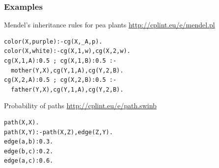 \documentclass[trans]{beamer}
\begin{document}
\begin{frame}[fragile]
  \frametitle{Examples}
Mendel's inheritance rules for pea plants \url{http://cplint.eu/e/mendel.pl}
\begin{verbatim}
color(X,purple):-cg(X,_A,p).
color(X,white):-cg(X,1,w),cg(X,2,w).
cg(X,1,A):0.5 ; cg(X,1,B):0.5 :-
  mother(Y,X),cg(Y,1,A),cg(Y,2,B).
cg(X,2,A):0.5 ; cg(X,2,B):0.5 :-
  father(Y,X),cg(Y,1,A),cg(Y,2,B).
\end{verbatim}
Probability of paths \url{http://cplint.eu/e/path.swinb}
\begin{verbatim}
path(X,X).
path(X,Y):-path(X,Z),edge(Z,Y).
edge(a,b):0.3.
edge(b,c):0.2.
edge(a,c):0.6.
\end{verbatim}
\end{frame}

%
%
%
\end{document}
